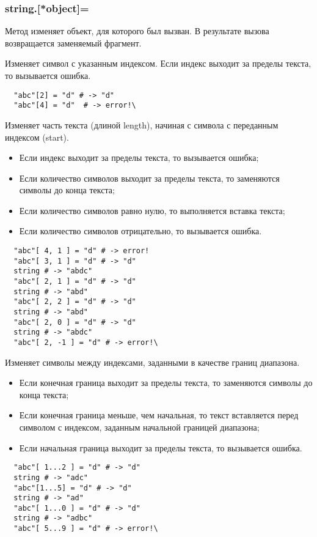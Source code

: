 \subsubsection*{string.[*object]=}

Метод изменяет объект, для которого был вызван. В результате вызова возвращается заменяемый фрагмент.

\begin{methodlist}
  Изменяет символ с указанным индексом. Если индекс выходит за пределы текста, то вызывается ошибка.
  \begin{verbatim}
  "abc"[2] = "d" # -> "d"
  "abc"[4] = "d"  # -> error!\
  \end{verbatim}

  Изменяет часть текста (длиной length), начиная с символа с переданным индексом (start).
  \begin{itemize}
    \item Если индекс выходит за пределы текста, то вызывается ошибка;
    \item Если количество символов выходит за пределы текста, то заменяются символы до конца текста;
    \item Если количество символов равно нулю, то выполняется вставка текста;
    \item Если количество символов отрицательно, то вызывается ошибка.
  \end{itemize}
  \begin{verbatim}
  "abc"[ 4, 1 ] = "d" # -> error!
  "abc"[ 3, 1 ] = "d" # -> "d"
  string # -> "abdc"
  "abc"[ 2, 1 ] = "d" # -> "d"
  string # -> "abd"
  "abc"[ 2, 2 ] = "d" # -> "d"
  string # -> "abd"
  "abc"[ 2, 0 ] = "d" # -> "d"
  string # -> "abdc"
  "abc"[ 2, -1 ] = "d" # -> error!\
  \end{verbatim}

  Изменяет символы между индексами, заданными в качестве границ диапазона. 
  \begin{itemize}
    \item Если конечная граница выходит за пределы текста, то заменяются символы до конца текста;
    \item Если конечная граница меньше, чем начальная, то текст вставляется перед символом с индексом, заданным начальной границей диапазона;
    \item Если начальная граница выходит за пределы текста, то вызывается ошибка.
  \end{itemize}
  \begin{verbatim}
  "abc"[ 1...2 ] = "d" # -> "d"
  string # -> "adc"
  "abc"[1...5] = "d" # -> "d"
  string # -> "ad"
  "abc"[ 1...0 ] = "d" # -> "d"
  string # -> "adbc"
  "abc"[ 5...9 ] = "d" # -> error!\
  \end{verbatim}


\end{methodlist}
